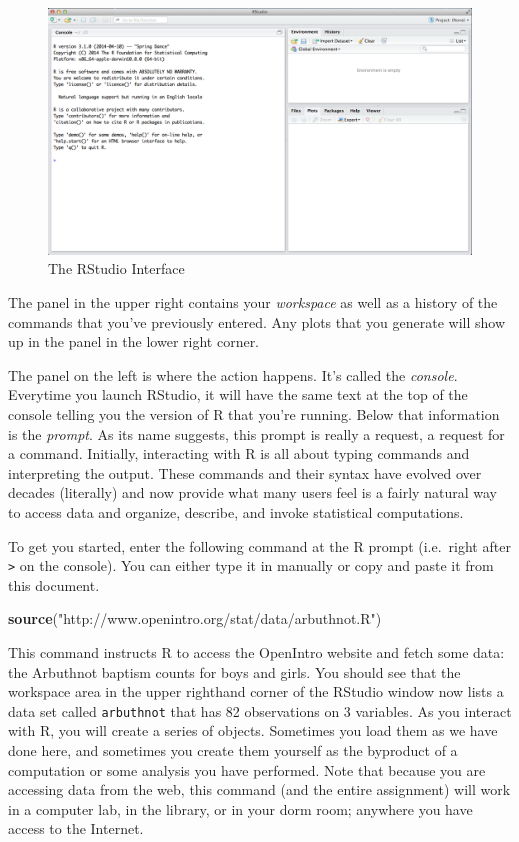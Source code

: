 \documentclass[]{book}
\newenvironment{Shaded}{\begin{snugshade}}{\end{snugshade}}
\newcommand{\KeywordTok}[1]{\textcolor[rgb]{0.13,0.29,0.53}{\textbf{{#1}}}}
\newcommand{\StringTok}[1]{\textcolor[rgb]{0.31,0.60,0.02}{{#1}}}
\newcommand{\NormalTok}[1]{{#1}}
\theoremstyle{definition}
\theoremstyle{definition}
\theoremstyle{definition}
\theoremstyle{remark}
\begin{document}
\begin{figure}[htbp]
\centering
\includegraphics{./assets/images/02-01.png}
\caption{The RStudio Interface}
\end{figure}

The panel in the upper right contains your \emph{workspace} as well as a
history of the commands that you've previously entered. Any plots that
you generate will show up in the panel in the lower right corner.

The panel on the left is where the action happens. It's called the
\emph{console}. Everytime you launch RStudio, it will have the same text
at the top of the console telling you the version of R that you're
running. Below that information is the \emph{prompt}. As its name
suggests, this prompt is really a request, a request for a command.
Initially, interacting with R is all about typing commands and
interpreting the output. These commands and their syntax have evolved
over decades (literally) and now provide what many users feel is a
fairly natural way to access data and organize, describe, and invoke
statistical computations.

To get you started, enter the following command at the R prompt
(i.e.~right after \texttt{\textgreater{}} on the console). You can
either type it in manually or copy and paste it from this document.

\begin{Shaded}
\begin{Highlighting}[]
\KeywordTok{source}\NormalTok{(}\StringTok{"http://www.openintro.org/stat/data/arbuthnot.R"}\NormalTok{)}
\end{Highlighting}
\end{Shaded}

This command instructs R to access the OpenIntro website and fetch some
data: the Arbuthnot baptism counts for boys and girls. You should see
that the workspace area in the upper righthand corner of the RStudio
window now lists a data set called \texttt{arbuthnot} that has 82
observations on 3 variables. As you interact with R, you will create a
series of objects. Sometimes you load them as we have done here, and
sometimes you create them yourself as the byproduct of a computation or
some analysis you have performed. Note that because you are accessing
data from the web, this command (and the entire assignment) will work in
a computer lab, in the library, or in your dorm room; anywhere you have
access to the Internet.
\end{document}
